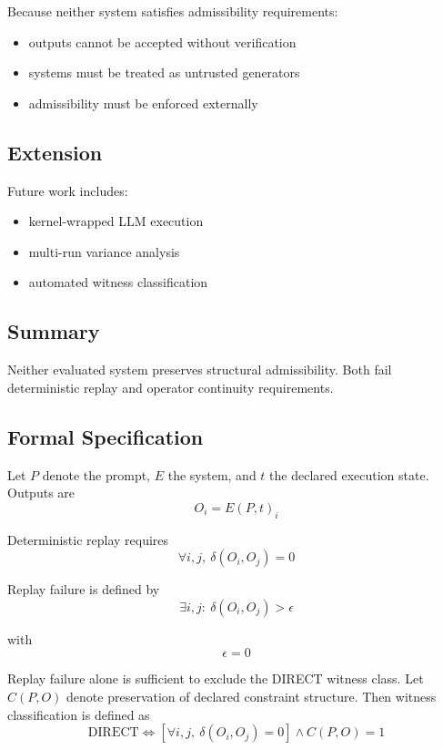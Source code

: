\documentclass[11pt]{article}
\begin{document}
Because neither system satisfies admissibility requirements:

\begin{itemize}
    \item outputs cannot be accepted without verification
    \item systems must be treated as untrusted generators
    \item admissibility must be enforced externally
\end{itemize}

\subsection{Extension}

Future work includes:

\begin{itemize}
    \item kernel-wrapped LLM execution
    \item multi-run variance analysis
    \item automated witness classification
\end{itemize}

\subsection{Summary}

Neither evaluated system preserves structural admissibility. Both fail deterministic replay and operator continuity requirements.

\subsection{Formal Specification}

Let $P$ denote the prompt, $E$ the system, and $t$ the declared execution state. Outputs are
\[
O_i = E(P,t)_i
\]

Deterministic replay requires
\[
\forall i,j,\ \delta(O_i,O_j)=0
\]

Replay failure is defined by
\[
\exists i,j:\ \delta(O_i,O_j) > \epsilon
\]

with
\[
\epsilon = 0
\]

Replay failure alone is sufficient to exclude the DIRECT witness class. Let $C(P,O)$ denote preservation of declared constraint structure. Then witness classification is defined as
\[
\mathrm{DIRECT} \iff
\left[
\forall i,j,\ \delta(O_i,O_j)=0
\right]
\land
C(P,O)=1
\]
\end{document}
